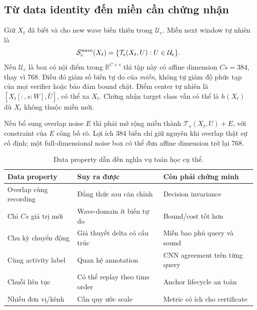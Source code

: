 \documentclass[11pt,a4paper]{article}
\newcommand{\R}{\mathbb R}
\newcommand{\Sset}{\mathcal S}
\newcommand{\Uset}{\mathcal U}
\theoremstyle{remark}
\begin{document}
\subsection{Từ data identity đến miền cần chứng nhận}
Giữ $X_t$ đã biết và cho new wave biến thiên trong $\Uset_e$. Miền next
window tự nhiên là
\begin{equation}
 \Sset^{\rm wave}_e(X_t)=
 \{\mathcal T_s(X_t,U):U\in\Uset_e\}.
 \label{eq:wave-domain}
\end{equation}
Nếu $\Uset_e$ là box có nội điểm trong $\R^{C\times s}$ thì tập này có
affine dimension $Cs=384$, thay vì 768. Điều đó giảm số biến tự do của
\emph{miền}, không tự giảm độ phức tạp của mọi verifier hoặc bảo đảm bound
chặt. Điểm center tự nhiên là $[X_t[:,s:W],\bar U]$, có thể xa $X_t$.
Chứng nhận target class vẫn có thể là $h(X_t)$ dù $X_t$ không thuộc miền mới.

Nếu bổ sung overlap noise $E$ thì phải mở rộng miền thành
$\mathcal T_s(X_t,U)+E$, với constraint của $E$ công bố rõ. Lợi ích 384
biến chỉ giữ nguyên khi overlap thật sự cố định; một full-dimensional
noise box có thể đưa affine dimension trở lại 768.

\begin{table}[htbp]\centering
\caption{Data property dẫn đến nghĩa vụ toán học cụ thể.}
\begin{tabularx}{\linewidth}{@{}YYY@{}}\toprule
Data property & Suy ra được & Còn phải chứng minh\\\midrule
Overlap cùng recording & Đẳng thức sau căn chỉnh & Decision invariance\\
Chỉ $Cs$ giá trị mới & Wave-domain ít biến tự do & Bound/cost tốt hơn\\
Chu kỳ chuyển động & Giả thuyết delta có cấu trúc & Miền bao phủ query và sound\\
Cùng activity label & Quan hệ annotation & CNN agreement trên từng query\\
Chuỗi liên tục & Có thể replay theo time order & Anchor lifecycle an toàn\\
Nhiều đơn vị/kênh & Cần quy ước scale & Metric có ích cho certificate\\\bottomrule
\end{tabularx}
\end{table}
\end{document}
